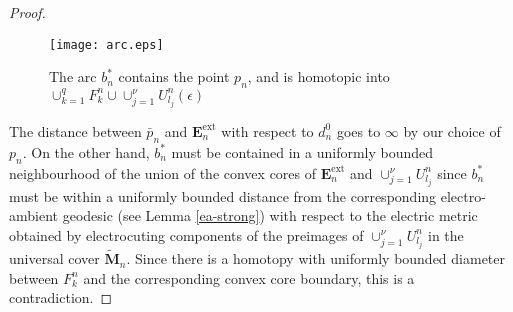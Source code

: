 \documentclass{amsart}
\theoremstyle{definition}
\newcommand\HHH{{\mathbb H}}
\begin{document}
\begin{proof}
\begin{center}
\begin{figure}
\texttt{[image: arc.eps]}

\caption{The arc $b^*_n$ contains the point $p_n$, and is homotopic into  $\cup_{k=1}^q F^n_k \cup \cup_{j=1}^\nu U^n_{l_j}(\epsilon)$}
\label{arc}
\end{figure}
\end{center}
\begin{comment}
Is it better to itemise the conditions?
\end{comment}

The distance between $\bar p_n$ and $\mathbf E_n^\mathrm{ext}$ with respect to $d^0_n$ goes to $\infty$ by our choice of $p_n$.
On the other hand, $b_n^*$ must be contained in a uniformly bounded neighbourhood of the union of the convex cores of $\mathbf E_n^\mathrm{ext}$ and $\cup_{j=1}^\nu U^n_{l_j}$ since $b_n^*$ must be within a uniformly bounded distance from the corresponding electro-ambient geodesic (see Lemma \ref{ea-strong}) with respect to the electric metric obtained by electrocuting  components of the preimages of  $\cup_{j=1}^\nu U^n_{l_j}$ in the universal cover $\widetilde{\mathbf M}_n$.
Since there is a homotopy with uniformly bounded diameter between $F^n_k$ and the corresponding convex core boundary, this is a contradiction.
%
%

\end{proof}
\end{document}

